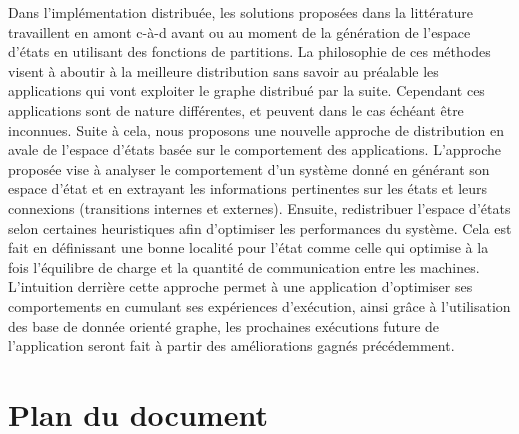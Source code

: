 Dans l’implémentation distribuée, les solutions proposées dans la littérature travaillent en amont c-à-d avant
ou au moment de la génération de l’espace d’états en utilisant des fonctions de partitions. La philosophie de ces méthodes visent à aboutir à la meilleure distribution sans savoir au préalable les applications qui vont exploiter le graphe distribué par la suite. Cependant ces applications sont de nature différentes, et peuvent dans le cas échéant être inconnues. Suite à cela, nous proposons une nouvelle approche de distribution en avale de l'espace d'états basée sur le comportement des applications. L’approche proposée vise à analyser le comportement d’un système donné en générant son espace d’état et en extrayant les informations pertinentes sur les états et leurs connexions (transitions internes et externes). Ensuite, redistribuer l’espace d’états selon certaines heuristiques afin d’optimiser les performances du système. Cela est fait en définissant une bonne localité pour l'état comme celle qui optimise à la
fois l’équilibre de charge et la quantité de communication entre les machines. L’intuition derrière cette approche permet à une application d'optimiser ses comportements en cumulant ses expériences d’exécution, ainsi grâce à l'utilisation des base de donnée orienté graphe, les prochaines exécutions future de l’application seront fait à partir des améliorations gagnés précédemment.

\section{Plan du document}


